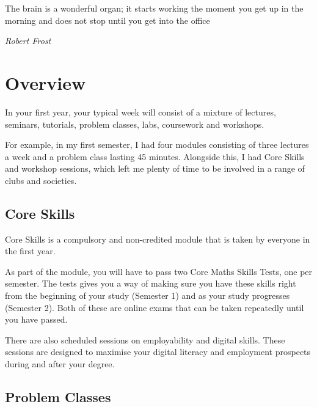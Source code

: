 \epigraph{The brain is a wonderful organ; it starts working the moment you get up in the morning and does not stop until you get into the office}
{\textit{Robert Frost}}

\section{Overview}


In your first year, your typical week will consist of a mixture of lectures, seminars, tutorials, problem classes, labs, coursework and workshops. 

For example, in my first semester, I had four modules consisting of three lectures a week and a problem class lasting 45 minutes. Alongside this, I had Core Skills and workshop sessions, which left me plenty of time to be involved in a range of clubs and societies.

\subsection{Core Skills}
Core Skills is a compulsory and non-credited module that is taken by everyone in the first year. 

As part of the module, you will have to pass two Core Maths Skills Tests, one per semester. The tests gives you a way of making sure you have these skills right from the beginning of your study (Semester 1) and as your study progresses (Semester 2). Both of these are online exams that can be taken repeatedly until you have passed. 

There are also scheduled sessions on employability and digital skills. These sessions are designed to maximise your digital literacy and employment prospects during and after your degree. 


\subsection{Problem Classes}

